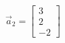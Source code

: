 \documentclass[preview]{standalone}
\begin{document}
\begin{align*}
\vec{a}_2=\begin{bmatrix} 3 \\ 2 \\ -2 \end{bmatrix}
\end{align*}
\end{document}
